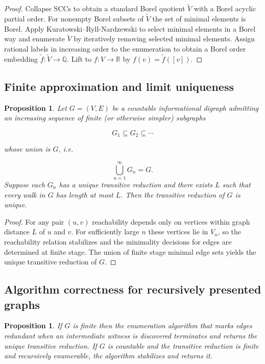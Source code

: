\documentclass[11pt]{article}
\newtheorem{proposition}[definition]{Proposition}
\begin{document}
\begin{proof}[Proof]
Collapse SCCs to obtain a standard Borel quotient $\widetilde V$ with a
Borel acyclic partial order. For nonempty Borel subsets of $\widetilde V$
the set of minimal elements is Borel. Apply Kuratowski–Ryll‑Nardzewski to
select minimal elements in a Borel way and enumerate $\widetilde V$ by
iteratively removing selected minimal elements. Assign rational labels in
increasing order to the enumeration to obtain a Borel order embedding
$\widetilde f:\widetilde V\to\mathbb Q$. Lift to $f:V\to\mathbb R$ by
$f(v)=\widetilde f([v])$.
\end{proof}

\subsection*{Finite approximation and limit uniqueness}
\begin{proposition}
Let $G=(V,E)$ be a countable informational digraph admitting an increasing sequence of finite (or otherwise simpler) subgraphs


\[
G_1 \subseteq G_2 \subseteq \cdots
\]


whose union is \(G\), i.e.


\[
\bigcup_{n=1}^\infty G_n = G.
\]
 Suppose each $G_n$ has a unique transitive reduction
and there exists $L$ such that every walk in $G$ has length at most $L$.
Then the transitive reduction of $G$ is unique.
\end{proposition}

\begin{proof}
For any pair $(u,v)$ reachability depends only on vertices within graph
distance $L$ of $u$ and $v$. For sufficiently large $n$ these vertices lie
in $V_n$, so the reachability relation stabilizes and the minimality
decisions for edges are determined at finite stage. The union of finite
stage minimal edge sets yields the unique transitive reduction of $G$.
\end{proof}

\subsection*{Algorithm correctness for recursively presented graphs}
\begin{proposition}
If $G$ is finite then the enumeration algorithm that marks edges redundant
when an intermediate witness is discovered terminates and returns the
unique transitive reduction. If $G$ is countable and the transitive
reduction is finite and recursively enumerable, the algorithm stabilizes
and returns it.
\end{proposition}
\end{document}
